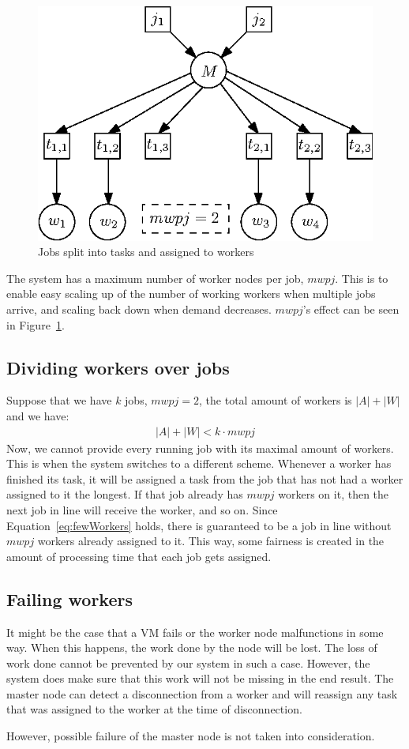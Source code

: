 \begin{figure}[ht!]
    \center
    \includegraphics{./img/splitjobtotasks.eps}
    \caption{Jobs split into tasks and assigned to workers}
    \label{fig:splitjobtotasks}
\end{figure}

The system has a maximum number of worker nodes per job, $mwpj$.
This is to enable easy scaling up of the number of working workers when multiple jobs arrive, and scaling back down when demand decreases.
$mwpj$'s effect can be seen in Figure~\ref{fig:splitjobtotasks}.

\subsection{Dividing workers over jobs}
Suppose that we have $k$ jobs, $mwpj = 2$, the total amount of workers is $|A| + |W|$ and we have:
\begin{align}|A|+|W| < k \cdot mwpj \label{eq:fewWorkers}\end{align}
Now, we cannot provide every running job with its maximal amount of workers.
This is when the system switches to a different scheme.
Whenever a worker has finished its task, it will be assigned a task from the job that has not had a worker assigned to it the longest.
If that job already has $mwpj$ workers on it, then the next job in line will receive the worker, and so on.
Since Equation~\ref{eq:fewWorkers} holds, there is guaranteed to be a job in line without $mwpj$ workers already assigned to it.
This way, some fairness is created in the amount of processing time that each job gets assigned.

\subsection{Failing workers}
It might be the case that a VM fails or the worker node malfunctions in some way.
When this happens, the work done by the node will be lost.
The loss of work done cannot be prevented by our system in such a case.
However, the system does make sure that this work will not be missing in the end result.
The master node can detect a disconnection from a worker and will reassign any task that was assigned to the worker at the time of disconnection.

However, possible failure of the master node is not taken into consideration.